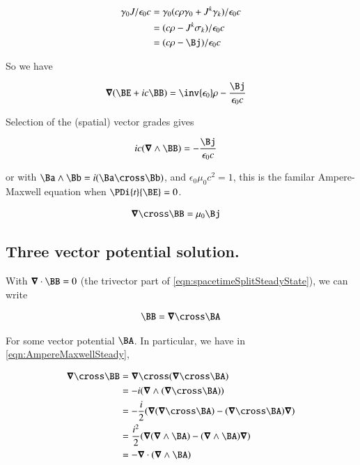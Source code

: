 \documentclass{article}
\begin{document}
\begin{align*}
\gamma_0 J/\epsilon_0 c 
&=
\gamma_0 (c \rho \gamma_0 + J^k \gamma_k)/\epsilon_0 c  \\
&=
(c \rho - J^k \sigma_k)/\epsilon_0 c  \\
&=
(c \rho - \Bj)/\epsilon_0 c  \\
\end{align*}

So we have

\begin{align}\label{eqn:spacetimeSplitSteadyState}
\spacegrad (\BE + i c \BB) 
&=
\inv{\epsilon_0}\rho - \frac{\Bj}{\epsilon_0 c} 
\end{align}

Selection of the (spatial) vector grades gives

\begin{align*}
i c (\spacegrad \wedge \BB) &= - \frac{\Bj}{\epsilon_0 c} 
\end{align*}

or with $\Ba \wedge \Bb = i (\Ba \cross \Bb)$, and $\epsilon_0 \mu_0 c^2 = 1$, this is the familar Ampere-Maxwell equation when $\PDi{t}{\BE} = 0$.

\begin{align}\label{eqn:AmpereMaxwellSteady}
\spacegrad \cross \BB &= \mu_0 \Bj
\end{align}

\subsection{ Three vector potential solution. }

With $\spacegrad \cdot \BB = 0$ (the trivector part of \ref{eqn:spacetimeSplitSteadyState}), we can write

\begin{align*}
\BB = \spacegrad \cross \BA 
\end{align*}

For some vector potential $\BA$.  In particular, we have in \ref{eqn:AmpereMaxwellSteady}, 

\begin{align*}
\spacegrad \cross \BB
&=
\spacegrad \cross (\spacegrad \cross \BA) \\
&=
-i (\spacegrad \wedge (\spacegrad \cross \BA) ) \\
&=
-\frac{i}{2} (
\spacegrad (\spacegrad \cross \BA) 
- (\spacegrad \cross \BA) \spacegrad 
) \\
&=
\frac{i^2}{2} (
\spacegrad (\spacegrad \wedge \BA) 
- (\spacegrad \wedge \BA) \spacegrad 
) \\
&=
- \spacegrad \cdot (\spacegrad \wedge \BA) 
\\
\end{align*}
\end{document}

